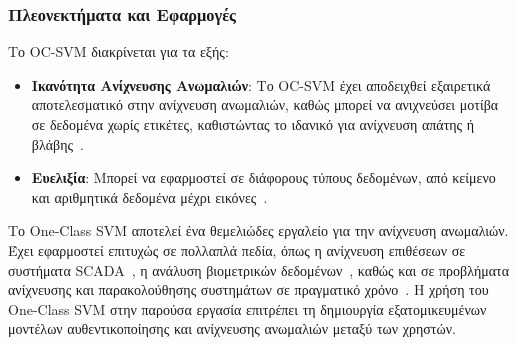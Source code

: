 \subsubsection{Πλεονεκτήματα και Εφαρμογές}
Το OC-SVM διακρίνεται για τα εξής:
\begin{itemize}
    \item \textbf{Ικανότητα Ανίχνευσης Ανωμαλιών}:
    Το OC-SVM έχει αποδειχθεί εξαιρετικά αποτελεσματικό στην ανίχνευση ανωμαλιών, καθώς μπορεί να ανιχνεύσει μοτίβα σε δεδομένα χωρίς ετικέτες, καθιστώντας το ιδανικό για ανίχνευση απάτης ή βλάβης~\cite{scholkopf2001ocsvm}.
    \item \textbf{Ευελιξία}:
    Μπορεί να εφαρμοστεί σε διάφορους τύπους δεδομένων, από κείμενο και αριθμητικά δεδομένα μέχρι εικόνες~\cite{seo2007application}.
\end{itemize}

Το One-Class SVM αποτελεί ένα θεμελιώδες εργαλείο για την ανίχνευση ανωμαλιών. Έχει εφαρμοστεί επιτυχώς σε πολλαπλά πεδία, όπως η ανίχνευση επιθέσεων σε συστήματα SCADA~\cite{laskov2004intrusion}, η ανάλυση βιομετρικών δεδομένων~\cite{hong2008fingerprint}, καθώς και σε προβλήματα ανίχνευσης και παρακολούθησης συστημάτων σε πραγματικό χρόνο~\cite{sun2017abnormal}. Η χρήση του One-Class SVM στην παρούσα εργασία επιτρέπει τη δημιουργία εξατομικευμένων μοντέλων αυθεντικοποίησης και ανίχνευσης ανωμαλιών μεταξύ των χρηστών.